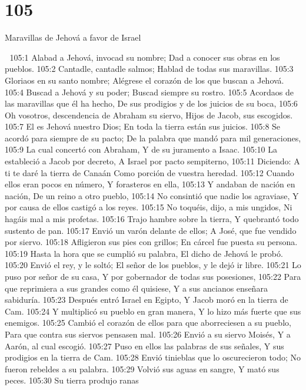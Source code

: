 \chapter{105}

Maravillas de Jehová a favor de Israel 
 

105:1 Alabad a Jehová, invocad su nombre; 
Dad a conocer sus obras en los pueblos. 
105:2 Cantadle, cantadle salmos; 
Hablad de todas sus maravillas. 
105:3 Gloriaos en su santo nombre; 
Alégrese el corazón de los que buscan a Jehová. 
105:4 Buscad a Jehová y su poder; 
Buscad siempre su rostro. 
105:5 Acordaos de las maravillas que él ha hecho, 
De sus prodigios y de los juicios de su boca, 
105:6 Oh vosotros, descendencia de Abraham su siervo, 
Hijos de Jacob, sus escogidos. 
105:7 El es Jehová nuestro Dios; 
En toda la tierra están sus juicios. 
105:8 Se acordó para siempre de su pacto; 
De la palabra que mandó para mil generaciones, 
105:9 La cual concertó con Abraham, 
Y de su juramento a Isaac. 
105:10 La estableció a Jacob por decreto, 
A Israel por pacto sempiterno, 
105:11 Diciendo: A ti te daré la tierra de Canaán 
Como porción de vuestra heredad. 
105:12 Cuando ellos eran pocos en número, 
Y forasteros en ella, 
105:13 Y andaban de nación en nación, 
De un reino a otro pueblo, 
105:14 No consintió que nadie los agraviase, 
Y por causa de ellos castigó a los reyes. 
105:15 No toquéis, dijo, a mis ungidos, 
Ni hagáis mal a mis profetas. 
105:16 Trajo hambre sobre la tierra, 
Y quebrantó todo sustento de pan. 
105:17 Envió un varón delante de ellos; 
A José, que fue vendido por siervo. 
105:18 Afligieron sus pies con grillos; 
En cárcel fue puesta su persona. 
105:19 Hasta la hora que se cumplió su palabra, 
El dicho de Jehová le probó. 
105:20 Envió el rey, y le soltó; 
El señor de los pueblos, y le dejó ir libre. 
105:21 Lo puso por señor de su casa, 
Y por gobernador de todas sus posesiones, 
105:22 Para que reprimiera a sus grandes como él quisiese, 
Y a sus ancianos enseñara sabiduría. 
105:23 Después entró Israel en Egipto, 
Y Jacob moró en la tierra de Cam. 
105:24 Y multiplicó su pueblo en gran manera, 
Y lo hizo más fuerte que sus enemigos. 
105:25 Cambió el corazón de ellos para que aborreciesen a su pueblo, 
Para que contra sus siervos pensasen mal. 
105:26 Envió a su siervo Moisés, 
Y a Aarón, al cual escogió. 
105:27 Puso en ellos las palabras de sus señales, 
Y sus prodigios en la tierra de Cam. 
105:28 Envió tinieblas que lo oscurecieron todo; 
No fueron rebeldes a su palabra. 
105:29 Volvió sus aguas en sangre, 
Y mató sus peces. 
105:30 Su tierra produjo ranas 
